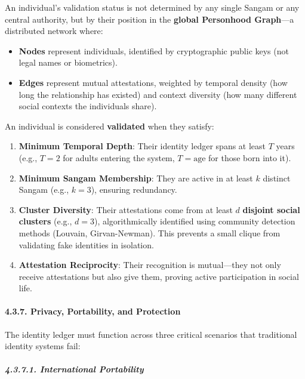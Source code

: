 An individual's validation status is not determined by any single Sangam
or any central authority, but by their position in the \textbf{global
Personhood Graph}---a distributed network where:

\begin{itemize}
\tightlist
\item
  \textbf{Nodes} represent individuals, identified by cryptographic
  public keys (not legal names or biometrics).
\item
  \textbf{Edges} represent mutual attestations, weighted by temporal
  density (how long the relationship has existed) and context diversity
  (how many different social contexts the individuals share).
\end{itemize}

An individual is considered \textbf{validated} when they satisfy:

\begin{enumerate}
\def\labelenumi{\arabic{enumi}.}
\item
  \textbf{Minimum Temporal Depth}: Their identity ledger spans at least
  \(T\) years (e.g., \(T = 2\) for adults entering the system,
  \(T = \text{age}\) for those born into it).
\item
  \textbf{Minimum Sangam Membership}: They are active in at least \(k\)
  distinct Sangam (e.g., \(k = 3\)), ensuring redundancy.
\item
  \textbf{Cluster Diversity}: Their attestations come from at least
  \(d\) \textbf{disjoint social clusters} (e.g., \(d = 3\)),
  algorithmically identified using community detection methods (Louvain,
  Girvan-Newman). This prevents a small clique from validating fake
  identities in isolation.
\item
  \textbf{Attestation Reciprocity}: Their recognition is mutual---they
  not only receive attestations but also give them, proving active
  participation in social life.
\end{enumerate}

\paragraph{4.3.7. Privacy, Portability, and
Protection}\label{privacy-portability-and-protection}

The identity ledger must function across three critical scenarios that
traditional identity systems fail:

\subparagraph{4.3.7.1. International
Portability}\label{international-portability}


